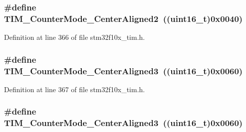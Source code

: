 \subsubsection[{\texorpdfstring{T\+I\+M\+\_\+\+Counter\+Mode\+\_\+\+Center\+Aligned2}{TIM_CounterMode_CenterAligned2}}]{\setlength{\rightskip}{0pt plus 5cm}\#define T\+I\+M\+\_\+\+Counter\+Mode\+\_\+\+Center\+Aligned2~(({\bf uint16\+\_\+t})0x0040)}\hypertarget{group___t_i_m___counter___mode_ga3793122e4c123a99e46fc2f04acea0d4}{}\label{group___t_i_m___counter___mode_ga3793122e4c123a99e46fc2f04acea0d4}


Definition at line 366 of file stm32f10x\+\_\+tim.\+h.

\subsubsection[{\texorpdfstring{T\+I\+M\+\_\+\+Counter\+Mode\+\_\+\+Center\+Aligned3}{TIM_CounterMode_CenterAligned3}}]{\setlength{\rightskip}{0pt plus 5cm}\#define T\+I\+M\+\_\+\+Counter\+Mode\+\_\+\+Center\+Aligned3~(({\bf uint16\+\_\+t})0x0060)}\hypertarget{group___t_i_m___counter___mode_ga65d9bc01ffa287cd7cf200d08c20a1ce}{}\label{group___t_i_m___counter___mode_ga65d9bc01ffa287cd7cf200d08c20a1ce}


Definition at line 367 of file stm32f10x\+\_\+tim.\+h.

\subsubsection[{\texorpdfstring{T\+I\+M\+\_\+\+Counter\+Mode\+\_\+\+Center\+Aligned3}{TIM_CounterMode_CenterAligned3}}]{\setlength{\rightskip}{0pt plus 5cm}\#define T\+I\+M\+\_\+\+Counter\+Mode\+\_\+\+Center\+Aligned3~(({\bf uint16\+\_\+t})0x0060)}\hypertarget{group___t_i_m___counter___mode_ga65d9bc01ffa287cd7cf200d08c20a1ce}{}\label{group___t_i_m___counter___mode_ga65d9bc01ffa287cd7cf200d08c20a1ce}


